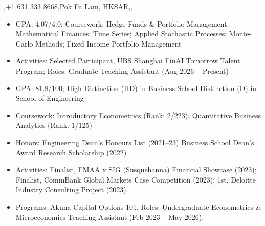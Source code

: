 \documentclass{article}
\begin{document}
  {\sep +1 631 333 8668\sep Pok Fu Lam, HKSAR\sep \linkedin\sep \github}
\cvheaderend

\begin{itemize}
  \item GPA: 4.07/4.0; Coursework: Hedge Funds \& Portfolio Management; Mathematical Finances; Time Series; Applied Stochastic Processes; Monte-Carlo Methods; Fixed Income Portfolio Management
  \item Activities: Selected Participant, UBS Shanghai FinAI Tomorrow Talent Program; Roles: Graduate Teaching Assistant (Aug 2026 -- Present)
\end{itemize}
\entrygap
{}
\begin{itemize}
  \item GPA: 81.8/100; High Distinction (HD) in Business School \textbar{} Distinction (D) in School of Engineering
  \item Coursework: Introductory Econometrics (Rank: 2/223); Quantitative Business Analytics (Rank: 1/125)
  \item Honors: Engineering Dean's Honours List (2021--23) \textbar{} Business School Dean's Award \textbar{} Research Scholarship (2022)
  \item Activities: Finalist, FMAA x SIG (Susquehanna) Financial Showcase (2023); Finalist, CommBank Global Markets Case Competition (2023); 1st, Deloitte Industry Consulting Project (2023).
  \item Programs: Akuna Capital Options 101. Roles: Undergraduate Econometrics \& Microeconomics Teaching Assistant (Feb 2023 -- May 2026).
\end{itemize}
\end{document}
